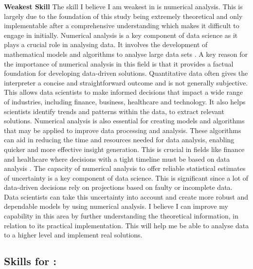 \documentclass[a4paper, 11pt]{report}
\begin{document}
\textbf{Weakest Skill}
\newline The skill I believe I am weakest in is numerical analysis. This is largely due to the foundation of this study being extremely theoretical and only implementable after a comprehensive understanding which makes it difficult to engage in initially. Numerical analysis is a key component of data science as it plays a crucial role in analysing data. It involves the development of mathematical models and algorithms to analyse large data sets \cite{stats}. 
\newline A key reason for the importance of numerical analysis in this field is that it provides a factual foundation for developing data-driven solutions. Quantitative data often gives the interpreter a concise and straightforward outcome and is not generally subjective. This allows data scientists to make informed decisions that impact a wide range of industries, including finance, business, healthcare and technology. It also helps scientists identify trends and patterns within the data, to extract relevant solutions. 
\newline Numerical analysis is also essential for creating models and algorithms that may be applied to improve data processing and analysis. These algorithms can aid in reducing the time and resources needed for data analysis, enabling quicker and more effective insight generation. This is crucial in fields like finance and healthcare where decisions with a tight timeline must be based on data analysis \cite{data}. 
The capacity of numerical analysis to offer reliable statistical estimates of uncertainty is a key component of data science. This is significant since a lot of data-driven decisions rely on projections based on faulty or incomplete data. Data scientists can take this uncertainty into account and create more robust and dependable models by using numerical analysis.
\newline I believe I can improve my capability in this area by further understanding the theoretical information, in relation to its practical implementation. This will help me be able to analyse data to a higher level and implement real solutions. 





\subsection{Skills for \majC: \studC}
\end{document}
